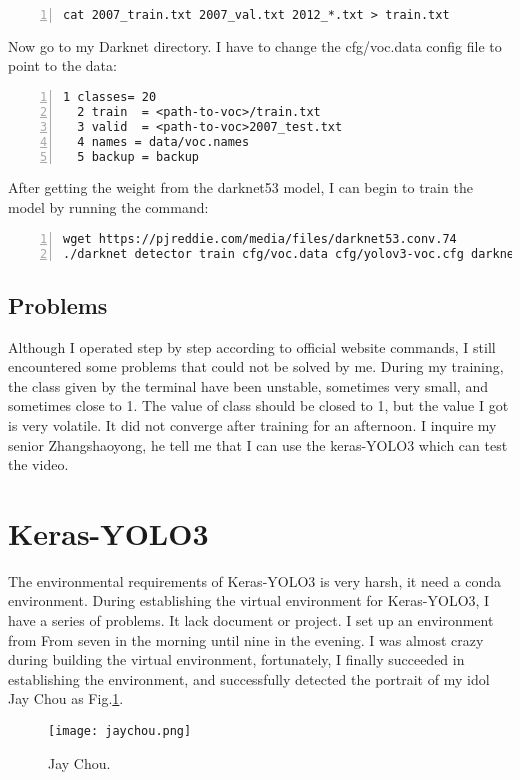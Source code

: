 \documentclass[a4paper]{article}
\begin{document}
\begin{lstlisting}[numbers=left, numberstyle=\tiny,keywordstyle=\color{blue!70},commentstyle=\color{red!50!green!50!blue!50},frame=shadowbox, rulesepcolor=\color{red!20!green!20!blue!20}] 
cat 2007_train.txt 2007_val.txt 2012_*.txt > train.txt
\end{lstlisting}
Now go to my Darknet directory. I have to change the cfg/voc.data config file to point to the data:
\begin{lstlisting}[numbers=left, numberstyle=\tiny,keywordstyle=\color{blue!70},commentstyle=\color{red!50!green!50!blue!50},frame=shadowbox, rulesepcolor=\color{red!20!green!20!blue!20}] 
  1 classes= 20
  2 train  = <path-to-voc>/train.txt
  3 valid  = <path-to-voc>2007_test.txt
  4 names = data/voc.names
  5 backup = backup
\end{lstlisting}
After getting the weight from the darknet53 model, I can begin to train the model by running the command:
\begin{lstlisting}[numbers=left, numberstyle=\tiny,keywordstyle=\color{blue!70},commentstyle=\color{red!50!green!50!blue!50},frame=shadowbox, rulesepcolor=\color{red!20!green!20!blue!20}] 
wget https://pjreddie.com/media/files/darknet53.conv.74
./darknet detector train cfg/voc.data cfg/yolov3-voc.cfg darknet53.conv.74
\end{lstlisting}
\subsection{Problems}
Although I operated step by step according to official website commands, I still encountered some problems that could not be solved by me. During my training, the class  given by the terminal have been unstable, sometimes very small, and sometimes close to 1. The value of class should be closed to 1, but the value I got is very volatile. It did not converge after training for an afternoon. I inquire my senior Zhangshaoyong, he tell me that I can use the keras-YOLO3 which can test the video.
\section{Keras-YOLO3}
The environmental requirements of Keras-YOLO3 is very harsh, it need a conda environment. During establishing the virtual environment for Keras-YOLO3, I have a series of problems. It lack document or project. I set up an environment from From seven in the morning until nine in the evening. I was almost crazy during building the virtual environment, fortunately, I finally succeeded in establishing the environment, and successfully detected the portrait of my idol Jay Chou as Fig.\ref{3}. 
\begin{figure}
\begin{center}
  \texttt{[image: jaychou.png]}\\
  \caption{Jay Chou.}\label{3}
\end{center}
\end{figure}
\end{document}
